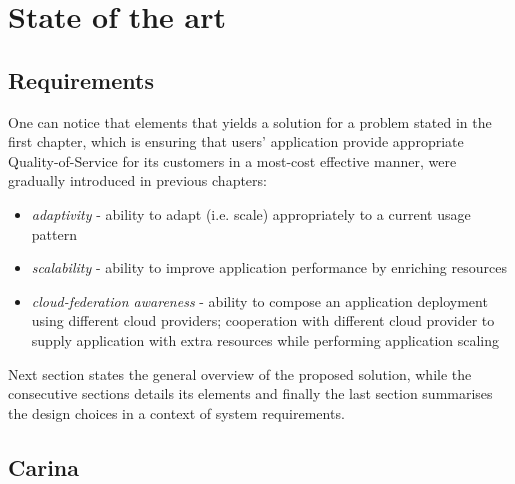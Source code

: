 \chapter{State of the art} 


\section{Requirements}
One can notice that elements that yields a solution for a problem stated in the first chapter, which is ensuring that users' application provide appropriate Quality-of-Service for its customers in a most-cost effective manner, were gradually introduced in previous chapters:

\begin{itemize}
	\item \emph{adaptivity} - ability to adapt (i.e. scale) appropriately to a current usage pattern
	\item \emph{scalability} - ability to improve application performance by enriching resources
	\item \emph{cloud-federation awareness} - ability to compose an application deployment using different cloud providers; cooperation with different cloud provider to supply application with extra resources while performing application scaling
\end{itemize}

Next section states the general overview of the proposed solution, while the consecutive sections details its elements and finally the last section summarises the design choices in a context of system requirements.
	
\section{Carina}

